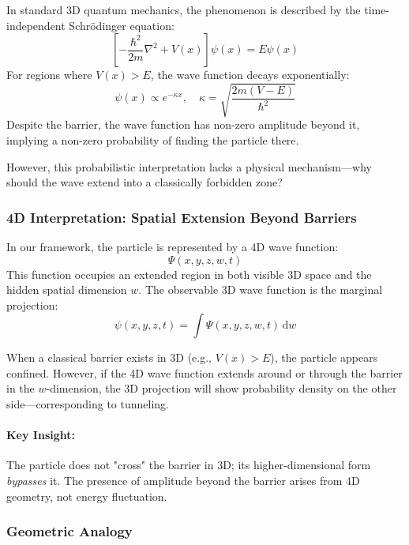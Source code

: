 \documentclass[12pt]{article}
\begin{document}
In standard 3D quantum mechanics, the phenomenon is described by the time-independent Schrödinger equation:
\begin{equation}
\left[ -\frac{\hbar^2}{2m} \nabla^2 + V(x) \right] \psi(x) = E \psi(x)
\end{equation}
For regions where \( V(x) > E \), the wave function decays exponentially:
\begin{equation}
\psi(x) \propto e^{-\kappa x}, \quad \kappa = \sqrt{\frac{2m(V - E)}{\hbar^2}}
\end{equation}
Despite the barrier, the wave function has non-zero amplitude beyond it, implying a non-zero probability of finding the particle there.

However, this probabilistic interpretation lacks a physical mechanism—why should the wave extend into a classically forbidden zone?

\subsubsection{4D Interpretation: Spatial Extension Beyond Barriers}

In our framework, the particle is represented by a 4D wave function:
\begin{equation}
\Psi(x, y, z, w, t)
\end{equation}
This function occupies an extended region in both visible 3D space and the hidden spatial dimension \( w \). The observable 3D wave function is the marginal projection:
\begin{equation}
\psi(x, y, z, t) = \int \Psi(x, y, z, w, t) \, \mathrm{d}w
\end{equation}

When a classical barrier exists in 3D (e.g., \( V(x) > E \)), the particle appears confined. However, if the 4D wave function extends around or through the barrier in the \( w \)-dimension, the 3D projection will show probability density on the other side—corresponding to tunneling.

\paragraph{Key Insight:}
The particle does not "cross" the barrier in 3D; its higher-dimensional form \emph{bypasses} it. The presence of amplitude beyond the barrier arises from 4D geometry, not energy fluctuation.

\subsubsection{Geometric Analogy}
\end{document}
